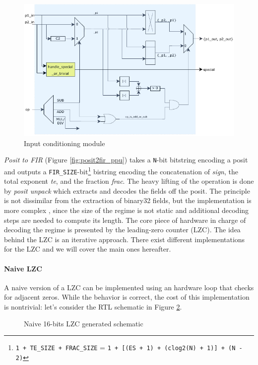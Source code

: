 \begin{figure}
    \centering
    \includegraphics[width=.75\textwidth]{figures/input_conditioning.pdf}
    \caption{Input conditioning module}
    \label{fig:input_conditioning_module}
\end{figure}



\textit{Posit to FIR} (Figure \ref{fig:posit2fir_ppu}) takes a \texttt{N}-bit bitstring encoding a posit and outputs a \texttt{FIR\_SIZE}-bit\footnote{\texttt{1 + TE\_SIZE + FRAC\_SIZE} = \texttt{1 + [(ES + 1) + (clog2(N) + 1)] + (N - 2)}} bistring encoding the concatenation of \textit{sign}, the total exponent \textit{te}, and the fraction \textit{frac}.
The heavy lifting of the operation is done by \textit{posit unpack} which extracts and decodes the fields off the posit. The principle is not dissimilar from the extraction of binary32 fields, but the implementation is more complex , since the size of the regime is not static and additional decoding steps are needed to compute its length.
The core piece of hardware in charge of decoding the regime is presented by the leading-zero counter (LZC). The idea behind the LZC is an iterative approach. There exist different implementations for the LZC and we will cover the main ones hereafter.

\paragraph{Naive LZC}

A naive version of a LZC can be implemented using an hardware loop that checks for adjacent zeros. While the behavior is correct, the cost of this implementation is nontrivial: let's consider the RTL schematic in Figure \ref{fig:lzc_sinthesyzed}.



\begin{figure}[h!]
    \noindent{}
    \caption{Naive 16-bits LZC generated schematic}
    \label{fig:lzc_sinthesyzed}
\end{figure}



